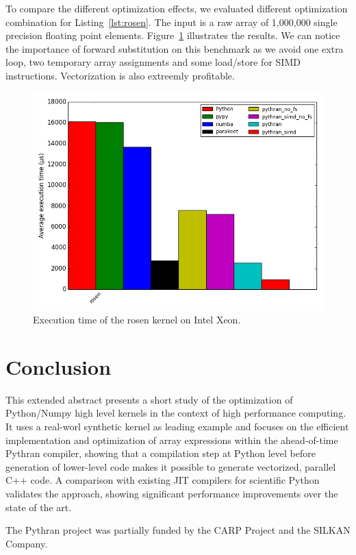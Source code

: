\documentclass[10pt, preprint, nocopyrightspace]{sigplanconf}
\begin{document}
To compare the different optimization effects, we evaluated different
optimization combination for Listing~\ref{lst:rosen}. The input is a raw array
of 1,000,000 single precision floating point elements.
Figure~\ref{fig:rosenintel8} illustrates the results. We can notice the
importance of forward substitution on this benchmark as we avoid one extra
loop, two temporary array assignments and some load/store for SIMD
instructions. Vectorization is also extreemly profitable.

\begin{figure}[t]
\centering
\includegraphics[width=.5\textwidth]{rosen_intel8.png}
\caption{Execution time of the rosen kernel on Intel Xeon.}
\label{fig:rosenintel8}
\end{figure}

\section*{Conclusion}

This extended abstract presents a short study of the optimization of Python/Numpy high level
kernels in the context of high performance computing. It uses a real-worl synthetic kernel as leading example and focuses on the efficient
implementation and optimization of array expressions within the ahead-of-time
Pythran compiler, showing that a compilation step at Python level before
generation of lower-level code makes it possible to generate vectorized,
parallel C++ code. A comparison with existing JIT compilers for scientific
Python validates the approach, showing significant performance improvements
over the state of the art.

\acks

The Pythran project was partially funded
by the CARP Project and the SILKAN Company.






\end{document}
